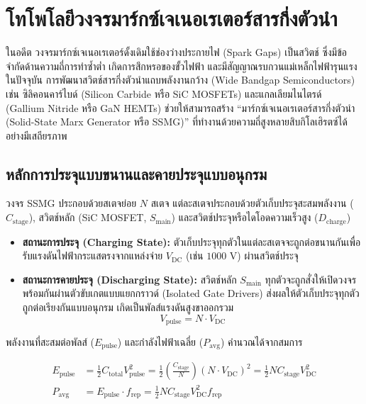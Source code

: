 \section{โทโพโลยีวงจรมาร์กซ์เจเนอเรเตอร์สารกึ่งตัวนำ}

ในอดีต วงจรมาร์กซ์เจเนอเรเตอร์ดั้งเดิมใช้ช่องว่างประกายไฟ (Spark Gaps) เป็นสวิตช์ ซึ่งมีข้อจำกัดด้านความถี่การทำซ้ำต่ำ เกิดการสึกหรอของขั้วไฟฟ้า และมีสัญญาณรบกวนแม่เหล็กไฟฟ้ารุนแรง ในปัจจุบัน การพัฒนาสวิตช์สารกึ่งตัวนำแถบพลังงานกว้าง (Wide Bandgap Semiconductors) เช่น ซิลิคอนคาร์ไบด์ (Silicon Carbide หรือ SiC MOSFETs) และแกลเลียมไนไตรด์ (Gallium Nitride หรือ GaN HEMTs) ช่วยให้สามารถสร้าง ``มาร์กซ์เจเนอเรเตอร์สารกึ่งตัวนำ (Solid-State Marx Generator หรือ SSMG)'' ที่ทำงานด้วยความถี่สูงหลายสิบกิโลเฮิรตซ์ได้อย่างมีเสถียรภาพ

\subsection{หลักการประจุแบบขนานและคายประจุแบบอนุกรม}
วงจร SSMG ประกอบด้วยสเตจย่อย $N$ สเตจ แต่ละสเตจประกอบด้วยตัวเก็บประจุสะสมพลังงาน ($C_{\text{stage}}$), สวิตช์หลัก (SiC MOSFET, $S_{\text{main}}$) และสวิตช์ประจุหรือไดโอดความเร็วสูง ($D_{\text{charge}}$)

\begin{itemize}
    \item \textbf{สถานะการประจุ (Charging State):} ตัวเก็บประจุทุกตัวในแต่ละสเตจจะถูกต่อขนานกันเพื่อรับแรงดันไฟฟ้ากระแสตรงจากแหล่งจ่าย $V_{\text{DC}}$ (เช่น $1000 \text{ V}$) ผ่านสวิตช์ประจุ
    \item \textbf{สถานะการคายประจุ (Discharging State):} สวิตช์หลัก $S_{\text{main}}$ ทุกตัวจะถูกสั่งให้เปิดวงจรพร้อมกันผ่านตัวขับเกตแบบแยกกราวด์ (Isolated Gate Drivers) ส่งผลให้ตัวเก็บประจุทุกตัวถูกต่อเรียงกันแบบอนุกรม เกิดเป็นพัลส์แรงดันสูงขาออกรวม
    \begin{equation}
        V_{\text{pulse}} = N \cdot V_{\text{DC}}
        \label{eq:marx_voltage}
    \end{equation}
\end{itemize}

พลังงานที่สะสมต่อพัลส์ ($E_{\text{pulse}}$) และกำลังไฟฟ้าเฉลี่ย ($P_{\text{avg}}$) คำนวณได้จากสมการ

\begin{align}
    E_{\text{pulse}} &= \frac{1}{2} C_{\text{total}} V_{\text{pulse}}^2 = \frac{1}{2} \left( \frac{C_{\text{stage}}}{N} \right) (N \cdot V_{\text{DC}})^2 = \frac{1}{2} N C_{\text{stage}} V_{\text{DC}}^2 \label{eq:marx_energy} \\
    P_{\text{avg}} &= E_{\text{pulse}} \cdot f_{\text{rep}} = \frac{1}{2} N C_{\text{stage}} V_{\text{DC}}^2 f_{\text{rep}} \label{eq:marx_power}
\end{align}

